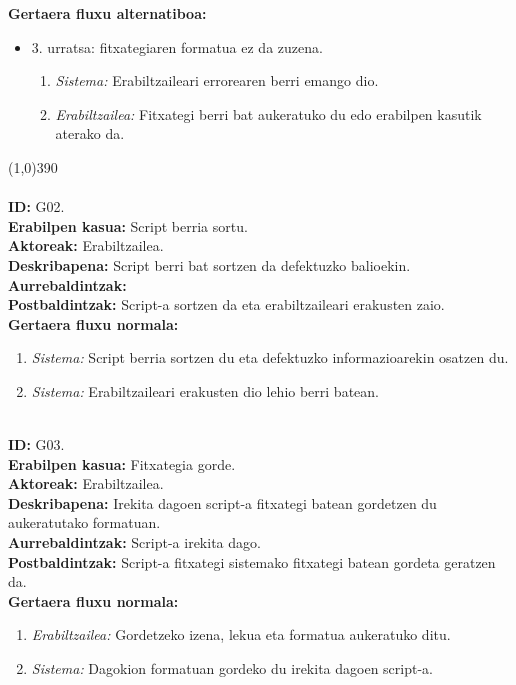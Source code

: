 \textbf{Gertaera fluxu alternatiboa:}
\begin{itemize}
	\item 3. urratsa: fitxategiaren formatua ez da zuzena.
		\begin{enumerate}
		\item \textit{Sistema:} Erabiltzaileari errorearen berri emango dio.
		\item \textit{Erabiltzailea:} Fitxategi berri bat aukeratuko du edo erabilpen kasutik aterako da.
		\end{enumerate}
\end{itemize}
\line(1,0){390}\\
\noindent\\
\textbf{ID:} G02.\\
\textbf{Erabilpen kasua:} Script berria sortu.\\
\textbf{Aktoreak:} Erabiltzailea.\\
\textbf{Deskribapena:} Script berri bat sortzen da defektuzko balioekin.\\
\textbf{Aurrebaldintzak:}\\
\textbf{Postbaldintzak:} Script-a sortzen da eta erabiltzaileari erakusten zaio.\\
\textbf{Gertaera fluxu normala:}
\begin{enumerate}
	\item \textit{Sistema:} Script berria sortzen du eta defektuzko informazioarekin osatzen du.
	\item \textit{Sistema:} Erabiltzaileari erakusten dio lehio berri batean.
\end{enumerate}
\noindent\\
\textbf{ID:} G03.\\
\textbf{Erabilpen kasua:} Fitxategia gorde.\\
\textbf{Aktoreak:} Erabiltzailea.\\
\textbf{Deskribapena:} Irekita dagoen script-a fitxategi batean gordetzen du aukeratutako formatuan.\\
\textbf{Aurrebaldintzak:} Script-a irekita dago.\\
\textbf{Postbaldintzak:} Script-a fitxategi sistemako fitxategi batean gordeta geratzen da.\\
\textbf{Gertaera fluxu normala:}
\begin{enumerate}
	\item \textit{Erabiltzailea:} Gordetzeko izena, lekua eta formatua aukeratuko ditu.
	\item \textit{Sistema:} Dagokion formatuan gordeko du irekita dagoen script-a.
\end{enumerate}
